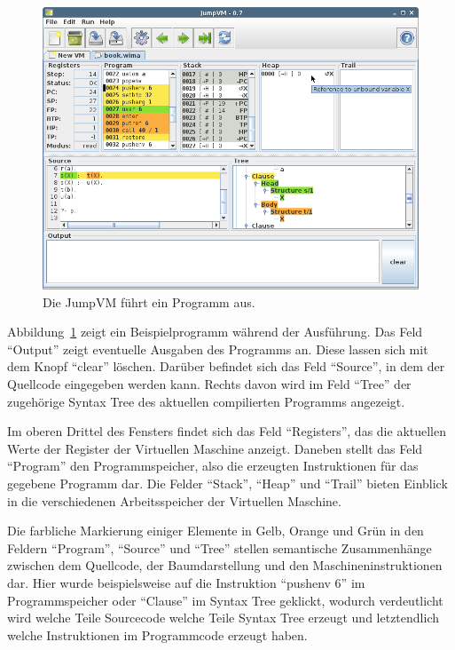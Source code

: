 \documentclass[german, a4paper, parskip, bibliography=totoc]{scrartcl}
\begin{document}
\begin{figure}[htb]
    \centering
    \includegraphics[width=\textwidth]{screenshot.png}
    \caption{Die JumpVM führt ein Programm aus.}
    \label{img_jumpvm_run}
\end{figure}

Abbildung~\ref{img_jumpvm_run} zeigt ein Beispielprogramm während der
Ausführung. Das Feld \enquote{Output} zeigt eventuelle Ausgaben des Programms
an. Diese lassen sich mit dem Knopf \enquote{clear} löschen. Darüber befindet
sich das Feld \enquote{Source}, in dem der Quellcode eingegeben
werden kann. Rechts davon wird im Feld \enquote{Tree} der zugehörige Syntax
Tree des aktuellen compilierten Programms angezeigt.

Im oberen Drittel des Fensters findet sich das Feld \enquote{Registers}, das
die aktuellen Werte der Register der Virtuellen Maschine anzeigt. Daneben
stellt das Feld \enquote{Program} den Programmspeicher, also die erzeugten
Instruktionen für das gegebene Programm dar. Die Felder \enquote{Stack},
\enquote{Heap} und \enquote{Trail} bieten Einblick in die verschiedenen
Arbeitsspeicher der Virtuellen Maschine.

Die farbliche Markierung einiger Elemente in Gelb, Orange und Grün in den
Feldern \enquote{Program}, \enquote{Source} und \enquote{Tree} stellen
semantische Zusammenhänge zwischen dem Quellcode, der Baumdarstellung und den
Maschineninstruktionen dar. Hier wurde beispielsweise auf die Instruktion
\enquote{pushenv 6} im Programmspeicher oder \enquote{Clause} im Syntax Tree
geklickt, wodurch verdeutlicht wird welche Teile Sourcecode welche Teile Syntax
Tree erzeugt und letztendlich welche Instruktionen im Programmcode erzeugt
haben.
\end{document}
